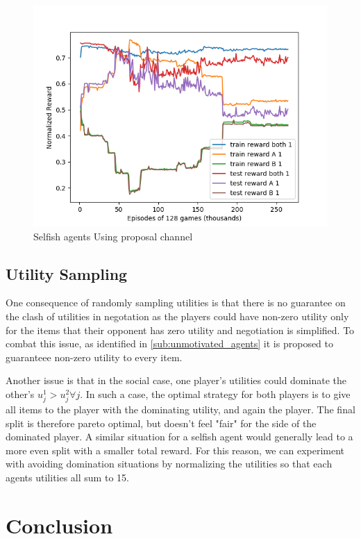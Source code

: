 \documentclass{article}
\begin{document}
\begin{figure}[h]
    \centering
    \includegraphics[width=0.8\linewidth]{self-prop.png}
    \caption{Selfish agents Using proposal channel}
    \label{fig:self-prop}
\end{figure}


\subsection{Utility Sampling}%
\label{sub:utility_sampling}
One consequence of randomly sampling utilities is that there is no
guarantee on the clash of utilities in negotation as the players could have
non-zero utility only for the items that their opponent has zero utility and
negotiation is simplified. To combat this issue, as identified in
\ref{sub:unmotivated_agents} it is proposed to guaranteee non-zero utility
to every item.

Another issue is that in the social case, one player's utilities could dominate
the other's $u_j^1 > u_j^2 \forall j$. In such a case, the optimal strategy for
both players is to give all items to the player with the dominating utility, and
again the player. The final split is therefore pareto optimal, but doesn't feel
"fair" for the side of the dominated player. A similar situation for a selfish
agent would generally lead to a more even split with a smaller total reward. For
this reason, we can experiment with avoiding domination situations by
normalizing the utilities so that each agents utilities all sum to 15.

\section{Conclusion}%
\label{sec:conclusion}
\end{document}
